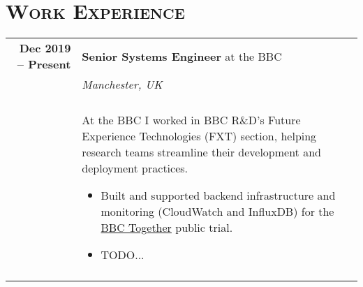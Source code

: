 \documentclass[a4paper,10pt]{article} %
\begin{document}
\section{\textsc{Work Experience}}
\centering
\begin{tabularx}{\textwidth}{r|X}

\textbf{Dec 2019 -- Present}        & \textbf{Senior Systems Engineer} at the BBC \\
                                    & \emph{Manchester, UK} \\
                                    & \\
                                    & \footnotesize
    {At the BBC I worked in BBC R\&D's Future Experience Technologies (FXT)
        section, helping research teams streamline their development and
        deployment practices.
    \begin{itemize}
        \item Built and supported backend infrastructure and monitoring
            (CloudWatch and InfluxDB) for the
            \href{https://www.bbc.co.uk/together}{BBC Together} public trial.
        \item TODO...
    \end{itemize}}\\

\multicolumn{2}{r}{} \\ %


\end{tabularx}
\end{document}

